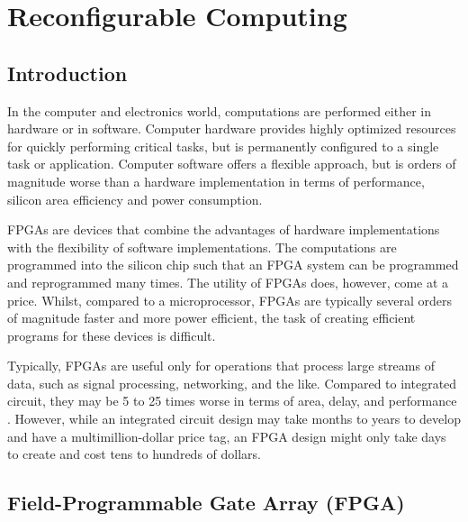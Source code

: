 \chapter{Reconfigurable Computing}
\label{ch:reconfigurableComputing}

\section{Introduction}
\label{sec:rcIntroduction}
In the computer and electronics world, computations are performed either in 
hardware or in software. Computer hardware provides highly optimized resources
for quickly performing critical tasks, but is permanently configured to a 
single task or application. Computer software offers a flexible approach, but is
orders of magnitude worse than a hardware implementation in terms of 
performance, silicon area efficiency and power consumption.

FPGAs are devices that combine the advantages of hardware implementations with 
the flexibility of software implementations. The computations are programmed 
into the silicon chip such that an FPGA system can be programmed and 
reprogrammed many times. The utility of FPGAs does, however, come at a price. 
Whilst, compared to a microprocessor, FPGAs are typically several orders of 
magnitude faster and more power efficient, the task of creating efficient 
programs for these devices is difficult.

Typically, FPGAs are useful only for operations that process large streams of 
data, such as signal processing, networking, and the like. Compared to 
integrated circuit, they may be 5 to 25 times worse in terms of area, delay, and
performance \cite{HAUCK08}. However, while an integrated circuit design may take
months to years to develop and have a multimillion-dollar price tag, an FPGA 
design might only take days to create and cost tens to hundreds of dollars.

\section{Field-Programmable Gate Array (FPGA)}
\label{sec:FPGA}
